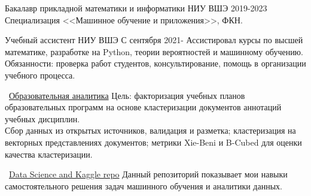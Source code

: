 \documentclass[11pt]{spidercv}
\begin{document}
    





    \begin{MainPart}

    \Experience
        {\ColorHighlight}
		{\Large{Бакалавр прикладной математики и информатики}}
		{НИУ ВШЭ}
        {2019-2023}
        {   
            Специализация <<Машинное обучение и приложения>>, ФКН.\\
        }

    \Experience
        {\ColorHighlight}
		{\Large{Учебный ассистент}}
		{НИУ ВШЭ}
            {С сентября 2021-\faUndo}
        {   
            Ассистировал курсы по высшей математике, разработке на Python, теории вероятностей и машинному обучению.\\

            Обязанности: проверка работ студентов, консультирование, помощь в организации учебного процесса.
        }

    \Experience
        {\ColorHighlight}
		{\Large\faGithub\ \href{https://github.com/necroshine0/edu-analytics}{Образовательная аналитика}}
            {}{}
        {   
            Цель: факторизация учебных планов образовательных программ на основе кластеризации документов аннотаций учебных дисциплин.\\
            
            Сбор данных из открытых источников, валидация и разметка; кластеризация на векторных представлениях документов; метрики Xie-Beni и B-Cubed для оценки качества кластеризации.\\
        }

    \Experience
        {\ColorHighlight}
		{\Large\faGithub\ \href{https://github.com/necroshine0/ds-notebooks}{Data Science and Kaggle repo}}
            {}{}
        {   
            Данный репозиторий показывает мои навыки самостоятельного решения задач машинного обучения и аналитики данных.\\
        }


\end{MainPart}
\end{document}
